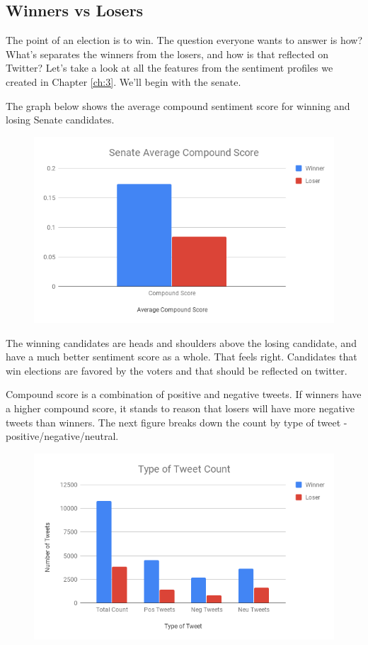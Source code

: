 \documentclass[11pt, twoside, reqno]{article}
\begin{document}
\subsection{Winners vs Losers}
\hspace{0.2in}The point of an election is to win. The question everyone wants to answer is how? What's separates the winners from the losers, and how is that reflected on Twitter? Let's take a look at all the features from the sentiment profiles we created in Chapter \ref{ch:3}. We'll begin with the senate. 

The graph below shows the average compound sentiment score for winning and losing Senate candidates.
\begin{figure}[H]
\centering
	\includegraphics[scale=0.5]{sen_ave_score}
\end{figure}
The winning candidates are heads and shoulders above the losing candidate, and have a much better sentiment score as a whole. That feels right. Candidates that win elections are favored by the voters and that should be reflected on twitter. 

Compound score is a combination of positive and negative tweets. If winners have a higher compound score, it stands to reason that losers will have more negative tweets than winners. The next figure breaks down the count by type of tweet - positive/negative/neutral. 

\begin{figure}[H]
\centering
	\includegraphics[scale=0.5]{tweet_type}
\end{figure}
\end{document}
